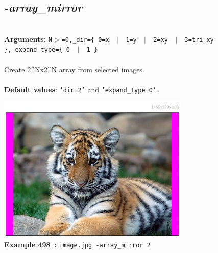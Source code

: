 \documentclass[a4paper,11pt,twoside]{book}
\begin{document}
\subsection{\emph{-array\_mirror} }\vspace*{-0.5em}
~\\\textbf{Arguments: } 
{\small \texttt{N$>$=0,\_dir=\{ 0=x ~$|$~ 1=y ~$|$~ 2=xy ~$|$~ 3=tri-xy \},\_expand\_type=\{ 0 ~$|$~ 1 \}}}\\~\\
Create 2\textasciicircum Nx2\textasciicircum N array from selected images.
~\\~\\\textbf{Default values}: {\small \texttt{'dir=2'} and \texttt{'expand\_type=0'.}}
\begin{center}\includegraphics[keepaspectratio=true,height=7cm,width=\textwidth]{img/gmic_def498.jpg}\\
{\footnotesize \textbf{Example 498~:} \texttt{image.jpg -array\_mirror 2}}
\end{center}
\end{document}
